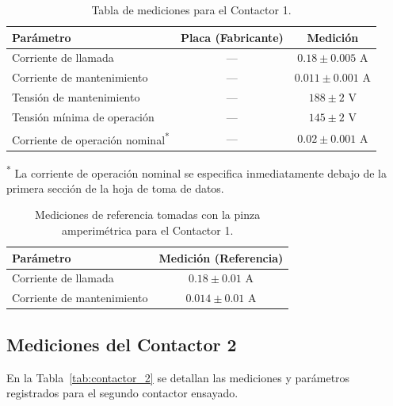 \begin{table}[H]
    \centering
    \caption{Tabla de mediciones para el Contactor 1.}
    \label{tab:contactor_1}
    \begin{tabular}{lcc}
        \toprule
        \textbf{Parámetro} & \textbf{Placa (Fabricante)} & \textbf{Medición} \\
        \midrule
        Corriente de llamada & --- & $\num{0,18} \pm \num{0,005}$ \si{\ampere} \\
        Corriente de mantenimiento & --- & $\num{0,011} \pm \num{0,001}$ \si{\ampere} \\
        Tensión de mantenimiento & --- & $\num{188} \pm \num{2}$ \si{\volt} \\
        Tensión mínima de operación & --- & $\num{145} \pm \num{2}$ \si{\volt} \\
        Corriente de operación nominal\textsuperscript{*} & --- & $\num{0,02} \pm \num{0,001}$ \si{\ampere} \\
        \bottomrule
    \end{tabular}
    \begin{flushleft}
        \footnotesize
        \textsuperscript{*} La corriente de operación nominal se especifica inmediatamente debajo de la primera sección de la hoja de toma de datos.
    \end{flushleft}
\end{table}

\begin{table}[H]
    \centering
    \caption{Mediciones de referencia tomadas con la pinza amperimétrica para el Contactor 1.}
    \label{tab:contactor_1_pinza}
    \begin{tabular}{lc}
        \toprule
        \textbf{Parámetro} & \textbf{Medición (Referencia)} \\
        \midrule
        Corriente de llamada & $\num{0,18} \pm \num{0,01}$ \si{\ampere} \\
        Corriente de mantenimiento & $\num{0,014} \pm \num{0,01}$ \si{\ampere} \\
        \bottomrule
    \end{tabular}
\end{table}

\subsection{Mediciones del Contactor 2}
En la Tabla~\ref{tab:contactor_2} se detallan las mediciones y parámetros registrados para el segundo contactor ensayado.

